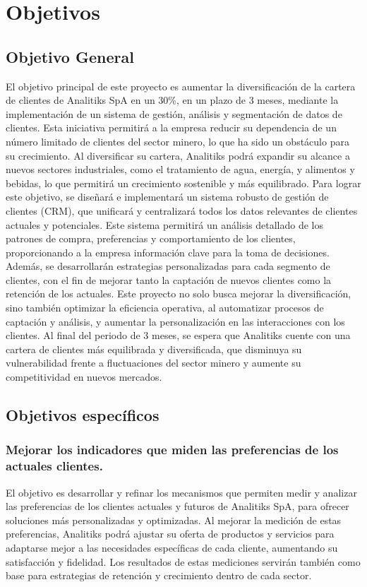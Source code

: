 \documentclass[12pt]{article}
\begin{document}
\newpage

\section{Objetivos}

\subsection{Objetivo General}
El objetivo principal de este proyecto es aumentar la diversificación de la cartera de clientes de Analitiks SpA en un 30\%, en un plazo de 3 meses, mediante la implementación de un sistema de gestión, análisis y segmentación de datos de clientes. Esta iniciativa permitirá a la empresa reducir su dependencia de un número limitado de clientes del sector minero, lo que ha sido un obstáculo para su crecimiento. Al diversificar su cartera, Analitiks podrá expandir su alcance a nuevos sectores industriales, como el tratamiento de agua, energía, y alimentos y bebidas, lo que permitirá un crecimiento sostenible y más equilibrado.
Para lograr este objetivo, se diseñará e implementará un sistema robusto de gestión de clientes (CRM), que unificará y centralizará todos los datos relevantes de clientes actuales y potenciales. Este sistema permitirá un análisis detallado de los patrones de compra, preferencias y comportamiento de los clientes, proporcionando a la empresa información clave para la toma de decisiones. Además, se desarrollarán estrategias personalizadas para cada segmento de clientes, con el fin de mejorar tanto la captación de nuevos clientes como la retención de los actuales.
Este proyecto no solo busca mejorar la diversificación, sino también optimizar la eficiencia operativa, al automatizar procesos de captación y análisis, y aumentar la personalización en las interacciones con los clientes. Al final del periodo de 3 meses, se espera que Analitiks cuente con una cartera de clientes más equilibrada y diversificada, que disminuya su vulnerabilidad frente a fluctuaciones del sector minero y aumente su competitividad en nuevos mercados.


\subsection{Objetivos específicos}
\subsubsection{Mejorar los indicadores que miden las preferencias de los actuales clientes.}
\noindent
El objetivo es desarrollar y refinar los mecanismos que permiten medir y analizar las preferencias de los clientes actuales y futuros de Analitiks SpA, para ofrecer soluciones más personalizadas y optimizadas. Al mejorar la medición de estas preferencias, Analitiks podrá ajustar su oferta de productos y servicios para adaptarse mejor a las necesidades específicas de cada cliente, aumentando su satisfacción y fidelidad. Los resultados de estas mediciones servirán también como base para estrategias de retención y crecimiento dentro de cada sector.
\end{document}

